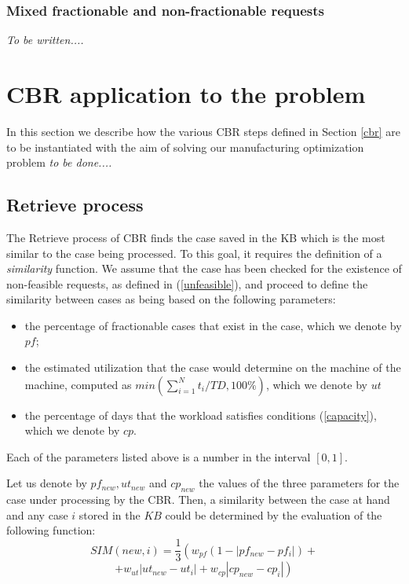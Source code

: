 \documentclass{IEEEtran}
\begin{document}
  \subsubsection{Mixed fractionable and non-fractionable requests} 
  
  {\em To be written....}
  
 



\section{CBR application to the problem}
\label{inst}
In this section we describe how the various CBR steps defined in Section \ref{cbr} are to be instantiated with the aim  of solving our manufacturing optimization problem {\em to be done....} 

\subsection{Retrieve process} 

The Retrieve process of CBR finds the case saved in the KB which is the most similar to the case being processed. 
To this goal, it requires the definition of a {\em similarity} function. 
We assume that the case has been checked for the existence of non-feasible requests, as defined in (\ref{unfeasible}), and proceed to  define the similarity between cases as being based on the following parameters: 
\begin{itemize}
\item  the percentage of fractionable cases that exist in the case, which we denote by $pf$; 
\item the estimated utilization that the case would determine on the machine of the machine, computed as $min(\sum_{i=1}^N t_i / TD,100\%)$, which we denote by $ut$
\item the percentage of days that the workload satisfies conditions (\ref{capacity}), which we denote by $cp$. 
\end{itemize}
Each of the parameters listed above is a number in the interval $[0,1]$. 

Let us denote by $pf_{new}, ut_{new}$ and $cp_{new}$ the values of the three parameters for the case under processing by the CBR. 
Then, a similarity between  the case at hand and any case $i$ stored in the $KB$ could be determined by the evaluation of the following function: 
\[
SIM(new,i)=\frac{1}{3}\left( w_{pf}(1-|pf_{new}-pf_i|)+\right.
\]
\begin{equation}
\left.+ w_{ut}|ut_{new}-ut_i|
+w_{cp}|cp_{new}-cp_i| \right)
\end{equation}
\end{document}
